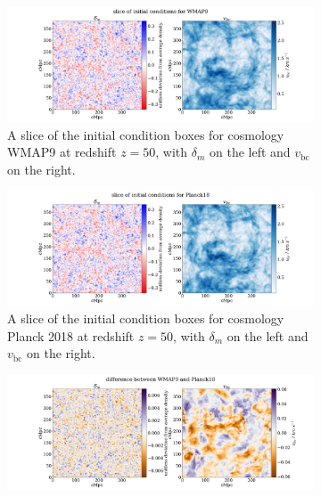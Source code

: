 \documentclass[floats,floatfix,showpacs,amssymb,prd,superscriptaddress,nofootinbib, 11pt]{revtex4-2} %
\begin{document}
\begin{figure}
     \centering
     \begin{subfigure}[b]{0.9\textwidth}
         \centering
         \includegraphics[width=\textwidth]{images/ic_grids/initial_condition_grid_WMAP9.png}
         \caption{A slice of the initial condition boxes for cosmology WMAP9 \citep{WMAP9results} at redshift $z = 50$, with $\delta_m$ on the left and $v_{\text{bc}}$ on the right.}
         \label{fig:IC_WMAP9}
     \end{subfigure}
     \hfill
     \begin{subfigure}[b]{0.9\textwidth}
         \centering
         \includegraphics[width=\textwidth]{images/ic_grids/initial_condition_grid_Planck18.png}
         \caption{A slice of the initial condition boxes for cosmology Planck 2018 \citep{Planck2018results} at redshift $z = 50$, with $\delta_m$ on the left and $v_{\text{bc}}$ on the right.}
         \label{fig:IC_Planck18}
     \end{subfigure}
     \hfill
     \begin{subfigure}[b]{0.9\textwidth}
         \centering
         \includegraphics[width=\textwidth]{images/ic_grids/difference_in_initial_grid_WMAP9_Planck18.png}

\end{subfigure}
\end{figure}
\end{document}
